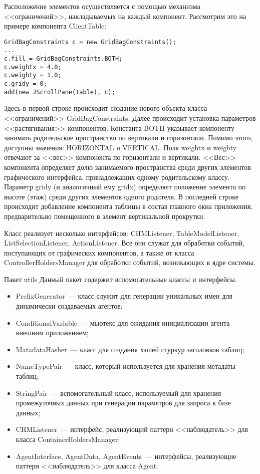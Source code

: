 Расположение элементов осуществляется с помощью механизма <<ограничений>>, накладываемых на каждый компонент. Рассмотрим это на примере компонента ClientTable:
\begin{verbatim}
GridBagConstraints c = new GridBagConstraints();
...
c.fill = GridBagConstraints.BOTH;
c.weightx = 4.0;
c.weighty = 1.0;
c.gridy = 0;
add(new JScrollPane(table), c);
\end{verbatim}
Здесь в первой строке происходит создание нового объекта класса <<ограничений>> GridBagConstraints. Далее происходит установка параметров <<растягивания>> компонентов. Константа BOTH указывает компоненту занимать родительское пространство по вертикали и горизонтали. Помимо этого, доступны значения: HORIZONTAL и VERTICAL. Поля weightx и weighty отвечают за <<вес>> компонента по горизонтали и вертикали. <<Вес>> компонента определяет долю занимаемого пространства среди других элементов графического интерфейса, принадлежащих одному родительскому классу. Параметр gridy (и аналогичный ему gridx) определяет положение элемента по высоте (этаж) среди других элементов одного родителя. В последней строке происходит добавление компонента таблицы в состав главного окна приложения, предварительно помещенного в элемент вертикальной прокрутки.

Класс реализует несколько интерфейсов: CHMListener, TableModelListener, ListSelectionListener, ActionListener. Все они служат для обработки событий, поступающих от графических компонентов, а также от класса ControllerHoldersManager для обработки событий, возникающих в ядре системы.

{Пакет utils}
Данный пакет содержит вспомогательные классы и интерфейсы.
\begin{itemize}
\item PrefixGenerator~--- класс служит для генерации уникальных имен для динамически создаваемых агентов;
\item ConditionalVariable~--- мьютекс для ожидания инициализации агента внешним приложением;
\item MatadataHasher~--- класс для создания хэшей стуркур заголовков таблиц;
\item NameTypePair~--- класс, который используется для хранения метадаты таблиц;
\item StringPair~--- вспомогательный класс, используемый для хранения промежуточных данных при генерации параметров для запроса к базе данных;
\item CHMListener~--- интерфейс, реализующий паттерн <<наблюдатель>> для класса ContainerHoldersManager;
\item AgentInterface, AgentData, AgentEvents~--- интерфейсы, реализующие паттерн <<наблюдатель>> для класса Agent.
\end{itemize}

